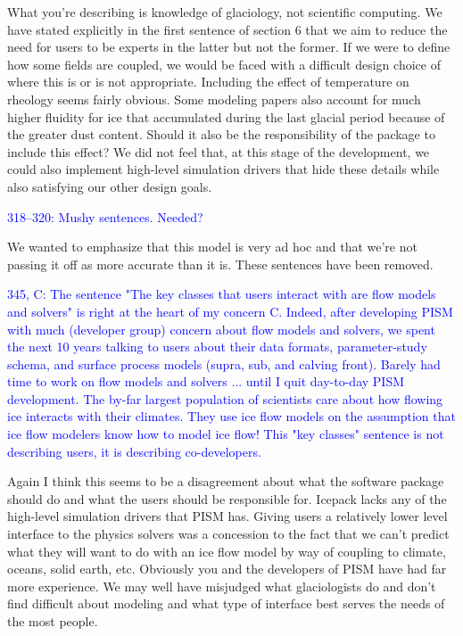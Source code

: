 \documentclass{article}
\theoremstyle{definition}
\theoremstyle{plain}
\begin{document}
What you're describing is knowledge of glaciology, not scientific computing.
We have stated explicitly in the first sentence of section 6 that we aim to reduce the need for users to be experts in the latter but not the former.
If we were to define how some fields are coupled, we would be faced with a difficult design choice of where this is or is not appropriate.
Including the effect of temperature on rheology seems fairly obvious.
Some modeling papers also account for much higher fluidity for ice that accumulated during the last glacial period because of the greater dust content.
Should it also be the responsibility of the package to include this effect?
We did not feel that, at this stage of the development, we could also implement high-level simulation drivers that hide these details while also satisfying our other design goals.

\textcolor{blue}{318--320:  Mushy sentences.  Needed?}

We wanted to emphasize that this model is very ad hoc and that we're not passing it off as more accurate than it is.
These sentences have been removed.

\textcolor{blue}{345, C:  The sentence "The key classes that users interact with are flow models and solvers" is right at the heart of my concern C.  Indeed, after developing PISM with much (developer group) concern about flow models and solvers, we spent the next 10 years talking to users about their data formats, parameter-study schema, and surface process models (supra, sub, and calving front).  Barely had time to work on flow models and solvers ... until I quit day-to-day PISM development.  The by-far largest population of scientists care about how flowing ice interacts with their climates.  They use ice flow models on the assumption that ice flow modelers know how to model ice flow!  This "key classes" sentence is not describing users, it is describing co-developers.}

Again I think this seems to be a disagreement about what the software package should do and what the users should be responsible for.
Icepack lacks any of the high-level simulation drivers that PISM has.
Giving users a relatively lower level interface to the physics solvers was a concession to the fact that we can't predict what they will want to do with an ice flow model by way of coupling to climate, oceans, solid earth, etc.
Obviously you and the developers of PISM have had far more experience.
We may well have misjudged what glaciologists do and don't find difficult about modeling and what type of interface best serves the needs of the most people.
\end{document}

